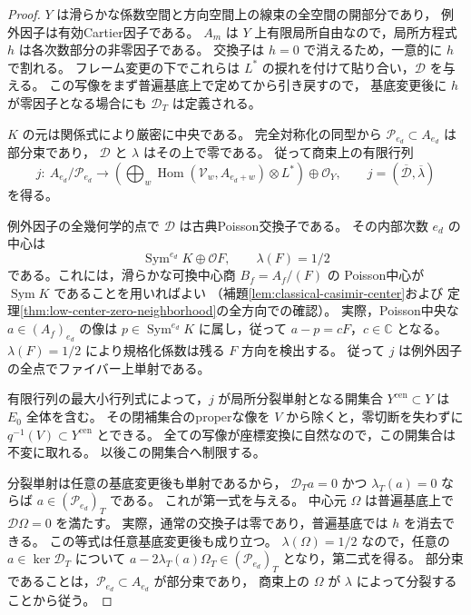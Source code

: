 \begin{proof}
$Y$ は滑らかな係数空間と方向空間上の線束の全空間の開部分であり，
例外因子は有効Cartier因子である。
$A_m$ は $Y$ 上有限局所自由なので，局所方程式 $h$ は各次数部分の非零因子である。
交換子は $h=0$ で消えるため，一意的に $h$ で割れる。
フレーム変更の下でこれらは $L^*$ の捩れを付けて貼り合い，$\mathcal D$ を与える。
この写像をまず普遍基底上で定めてから引き戻すので，
基底変更後に $h$ が零因子となる場合にも $\mathcal D_T$ は定義される。

$K$ の元は関係式により厳密に中央である。
完全対称化の同型から $\mathcal P_{e_d}\subset A_{e_d}$ は部分束であり，
$\mathcal D$ と $\lambda$ はその上で零である。
従って商束上の有限行列
\[
 j:\ A_{e_d}/\mathcal P_{e_d}\longrightarrow
   \left(\bigoplus_w\operatorname{Hom}
       (\mathcal V_w,A_{e_d+w})\otimes L^*\right)\oplus\mathcal O_Y,
 \qquad j=(\overline{\mathcal D},\overline\lambda)
\]
を得る。

例外因子の全幾何学的点で $\mathcal D$ は古典Poisson交換子である。
その内部次数 $e_d$ の中心は
\[
            \operatorname{Sym}^{e_d}K\oplus\mathcal O F,
 \qquad \lambda(F)=1/2
\]
である。これには，滑らかな可換中心商 $B_f=A_f/(F)$ の
Poisson中心が $\operatorname{Sym}K$ であることを用いればよい
（補題\ref{lem:classical-casimir-center}および
定理\ref{thm:low-center-zero-neighborhood}の全方向での確認）。
実際，Poisson中央な $a\in(A_f)_{e_d}$ の像は
$p\in\operatorname{Sym}^{e_d}K$ に属し，従って
$a-p=cF$，$c\in\mathbb C$ となる。
$\lambda(F)=1/2$ により規格化係数は残る $F$ 方向を検出する。
従って $j$ は例外因子の全点でファイバー上単射である。

有限行列の最大小行列式によって，$j$ が局所分裂単射となる開集合
$Y^{\mathrm{cen}}\subset Y$ は $E_0$ 全体を含む。
その閉補集合のproperな像を $V$ から除くと，零切断を失わずに
$q^{-1}(V)\subset Y^{\mathrm{cen}}$ とできる。
全ての写像が座標変換に自然なので，この開集合は不変に取れる。
以後この開集合へ制限する。

分裂単射は任意の基底変更後も単射であるから，
$\mathcal D_T a=0$ かつ $\lambda_T(a)=0$ ならば $a\in(\mathcal P_{e_d})_T$ である。
これが第一式を与える。
中心元 $\Omega$ は普遍基底上で $\mathcal D\Omega=0$ を満たす。
実際，通常の交換子は零であり，普遍基底では $h$ を消去できる。
この等式は任意基底変更後も成り立つ。
$\lambda(\Omega)=1/2$ なので，任意の $a\in\ker\mathcal D_T$ について
$a-2\lambda_T(a)\Omega_T\in(\mathcal P_{e_d})_T$ となり，第二式を得る。
部分束であることは，$\mathcal P_{e_d}\subset A_{e_d}$ が部分束であり，
商束上の $\Omega$ が $\lambda$ によって分裂することから従う。
\end{proof}

